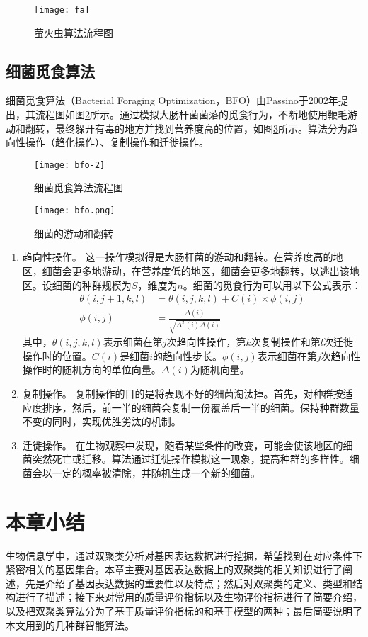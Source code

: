   \begin{figure}[htbp]
    \centering
    \texttt{[image: fa]}
    \caption{萤火虫算法流程图}
    \label{fig:fa}
  \end{figure}

  \subsection{细菌觅食算法}
  细菌觅食算法（Bacterial Foraging Optimization，BFO）由Passino于2002年提出，其流程图如图\ref{fig:bfo-2}所示。通过模拟大肠杆菌菌落的觅食行为，不断地使用鞭毛游动和翻转，最终躲开有毒的地方并找到营养度高的位置，如图\ref{fig:bfo}所示。算法分为趋向性操作（趋化操作）、复制操作和迁徙操作。
  \begin{figure}[htbp]
    \centering
    \texttt{[image: bfo-2]}
    \caption{细菌觅食算法流程图}
    \label{fig:bfo-2}
  \end{figure}
  
  \begin{figure}[htbp]
    \centering
    \texttt{[image: bfo.png]}
    \caption{细菌的游动和翻转}
    \label{fig:bfo}
  \end{figure}

  \begin{enumerate}
    \item[1.] 趋向性操作。 
    这一操作模拟得是大肠杆菌的游动和翻转。在营养度高的地区，细菌会更多地游动，在营养度低的地区，细菌会更多地翻转，以逃出该地区。设细菌的种群规模为$S$，维度为$n$。细菌的觅食行为可以用以下公式表示：
    \begin{align}
      \theta(i,j+1,k,l) &= \theta(i,j,k,l) + C(i) \times \phi(i,j) \\
      \phi(i,j) &= \frac{\Delta(i)}{\sqrt{\Delta^T(i)\Delta(i)}}
    \end{align}
    其中，$\theta(i,j,k,l)$表示细菌在第$j$次趋向性操作，第$k$次复制操作和第$l$次迁徙操作时的位置。$C(i)$是细菌$i$的趋向性步长。$\phi(i,j)$表示细菌在第$j$次趋向性操作时的随机方向的单位向量。$\Delta(i)$为随机向量。

    \item[2.] 复制操作。
    复制操作的目的是将表现不好的细菌淘汰掉。首先，对种群按适应度排序，然后，前一半的细菌会复制一份覆盖后一半的细菌。保持种群数量不变的同时，实现优胜劣汰的机制。

    \item[3.] 迁徙操作。
    在生物观察中发现，随着某些条件的改变，可能会使该地区的细菌突然死亡或迁移。算法通过迁徙操作模拟这一现象，提高种群的多样性。细菌会以一定的概率被清除，并随机生成一个新的细菌。
    
  \end{enumerate}

\section{本章小结}
生物信息学中，通过双聚类分析对基因表达数据进行挖掘，希望找到在对应条件下紧密相关的基因集合。本章主要对基因表达数据上的双聚类的相关知识进行了阐述，先是介绍了基因表达数据的重要性以及特点；然后对双聚类的定义、类型和结构进行了描述；接下来对常用的质量评价指标以及生物评价指标进行了简要介绍，以及把双聚类算法分为了基于质量评价指标的和基于模型的两种；最后简要说明了本文用到的几种群智能算法。